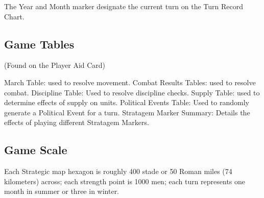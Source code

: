 The Year and Month marker designate the current turn on the Turn Record Chart.

\subsection{Game Tables} (Found on the Player Aid Card)

March Table: used to resolve movement.
Combat Results Tables: used to resolve combat.
Discipline Table: Used to resolve discipline checks.
Supply Table: used to determine effects of supply on units.
Political Events Table: Used to randomly generate a Political Event for a turn.
Stratagem Marker Summary: Details the effects of playing different Stratagem Markers.

\subsection{Game Scale}

Each Strategic map hexagon is roughly 400 stade or 50 Roman miles (74 kilometers) across; each strength point is 1000 men; each turn represents one month in summer or three in winter.
